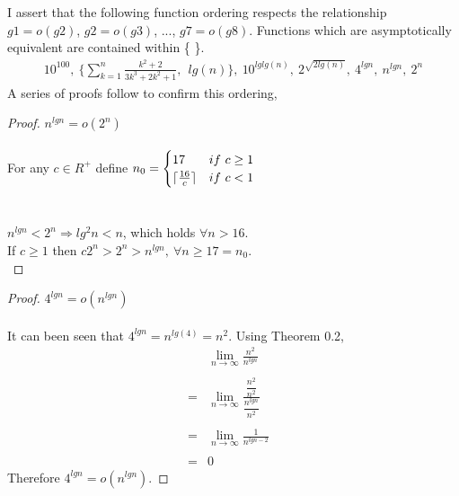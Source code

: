 \documentclass[12pt]{article}
\newenvironment{question}[2][Question]{\begin{trivlist}
\item[\hskip \labelsep {\bfseries #1}\hskip \labelsep {\bfseries #2.}]}{\end{trivlist}}
\DeclarePairedDelimiter{\ceil}{\lceil}{\rceil}
\begin{document}
\begin{question}{4}
  I assert that the following function ordering respects the relationship
  $g1 = o(g2)$, $g2 = o(g3)$, ..., $g7 = o(g8)$.  Functions which are
  asymptotically equivalent are contained within \{ \}.
  \begin{align*}
    10^{100},\ \bigl\{\sum_{k=1}^{n} \frac{k^{2} + 2}{3k^{3} + 2k^{2} + 1},\ 
    \ lg(n) \bigr\},\ 10^{lglg(n)},\ 2^{\sqrt{2lg(n)}},\ 4^{lgn},\ n^{lgn},\ 2^{n}
  \end{align*}
  A series of proofs follow to confirm this ordering,

  \begin{proof} $n^{lgn} = o(2^{n})$
    \leavevmode \\ \\
    For any $c \in R^{+}$ define $n_{0} = \begin{cases}
                                               17 & if\ c \geq 1 \\
                                               \ceil{\frac{16}{c}} & if\ c < 1\\
                                          \end{cases}$\\ \\ \\
     $n^{lgn} < 2^{n} \Rightarrow lg^{2}n < n$,
    which holds $\forall n > 16$.\\
    If $c \geq 1$ then $c2^{n} > 2^{n} > n^{lgn},\ \forall n \geq 17 = n_{0}$.\\

  \end{proof}

  \begin{proof} $4^{lgn} = o(n^{lgn})$
    \leavevmode \\ \\
    It can been seen that $4^{lgn} = n^{lg(4)} = n^{2}$.  Using Theorem 0.2,
    \begin{align*}
      &\lim_{n\to\infty} \frac{
        n^{2}
      }{
        n^{lgn}
      }&\\ \\
      = &\lim_{n\to\infty} \frac{
        \dfrac{n^{2}}{n^{2}}
      }{
        \dfrac{n^{lgn}}{n^{2}}
      }&\\ \\
      = & \lim_{n\to\infty} \frac{
        1
      }{n^{lgn - 2}}\\ \\
      = & 0
    \end{align*}
    Therefore $4^{lgn} = o(n^{lgn})$.
  \end{proof}


\end{question}
\end{document}
